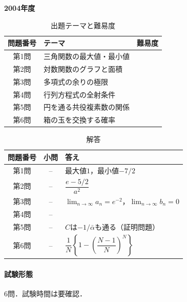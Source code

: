 \documentclass[../../main.tex]{subfiles}
\begin{document}
\begin{center}
  {\fontsize{48pt}{58pt}\selectfont \textbf{2004}\normalsize\textbf{年度}}
\end{center}

\begin{table}[htb]
  \centering
  \caption{出題テーマと難易度}
  \begin{tabular}{|c|p{9cm}|c|}
    \hline
    \textbf{問題番号} & \textbf{テーマ} & \textbf{難易度} \\
    \hline
    第1問 & 三角関数の最大値・最小値 & \\
    \hline
    第2問 & 対数関数のグラフと面積 & \\
    \hline
    第3問 & 多項式の余りの極限 & \\
    \hline
    第4問 & 行列方程式の全射条件 & \\
    \hline
    第5問 & 円を通る共役複素数の関係 & \\
    \hline
    第6問 & 箱の玉を交換する確率 & \\
    \hline
  \end{tabular}
\end{table}

\begin{table}[htb]
  \centering
  \caption{解答}
  \renewcommand{\arraystretch}{1.4}
  \begin{tabular}{|c|c|p{9cm}|}
    \hline
    \textbf{問題番号} & \textbf{小問} & \textbf{答え} \\
    \hline
    第1問 & -- & 最大値$1$，最小値$-7/2$ \\
    \hline
    第2問 & -- & $\dfrac{e-5/2}{a^2}$ \\
    \hline
    第3問 & -- & $\lim_{n\to\infty}a_n=e^{-2}$，$\lim_{n\to\infty}b_n=0$ \\
    \hline
    第4問 & -- &  \\
    \hline
    第5問 & -- & $C$は$-1/\bar{\alpha}$も通る（証明問題） \\
    \hline
    第6問 & -- & $\dfrac{1}{N}\left\{1-\left(\dfrac{N-1}{N}\right)^N\right\}$ \\
    \hline
  \end{tabular}
\end{table}

\paragraph{試験形態}
6問．試験時間は要確認．
\end{document}
